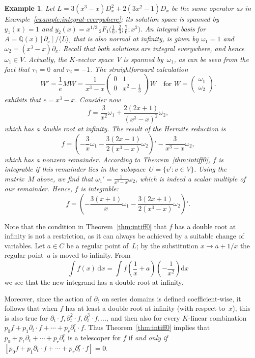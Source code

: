 \documentclass[final,1p,times,authoryear]{elsarticle}
\newtheorem{example}[theorem]{Example}
\def\<#1>{\langle#1\rangle}
\newcommand{\bQ}{ {\mathbb Q}}
\begin{document}
\begin{example}
Let $L = 3 (x^3-x) D_x^2 + 2 (3x^2 - 1) D_x$ be the same operator as in
Example~\ref{example:integral-everywhere}; its solution space is spanned by
$y_1(x)=1$ and $y_2(x)=x^{1/3}{}\,_2F_{\!1}\bigl(\frac16,\frac23;\frac76;x^2\bigr)$.
An integral basis for $A=\bQ(x)[\partial_x]/\<L>$, that is also normal at
infinity, is given by $\omega_1=1$ and $\omega_2=(x^3-x)\partial_x$. Recall
that both solutions are integral everywhere, and hence $\omega_1\in V$.
Actually, the $K$-vector space~$V$ is spanned by~$\omega_1$, as can be seen
from the fact that $\tau_1=0$ and $\tau_2=-1$. The straightforward calculation
\[
  W' = \frac{1}{e}MW =
  \frac{1}{x^3-x}\begin{pmatrix}0 & 1\\ 0 & x^2-\frac13\end{pmatrix}W
  \quad\text{for }W=\begin{pmatrix}\omega_1\\ \omega_2\end{pmatrix}.
\]
exhibits that $e=x^3-x$. Consider now
\[
  f = \frac{3}{x^2}\omega_1 + \frac{2(2x+1)}{(x^3-x)^2}\omega_2,
\]
which has a double root at infinity. The result of the Hermite reduction is
\[
  f = \left(-\frac{3}{x}\omega_1-\frac{3(2x+1)}{2(x^3-x)}\omega_2\right)'
    - \frac{3}{x^3-x}\omega_2,
\]
which has a nonzero remainder. According to Theorem~\ref{thm:intiff0}, $f$
is integrable if this remainder lies in the subspace~$U=\{v':v\in V\}$.
Using the matrix~$M$ above, we find that $\omega_1'=\frac{1}{x^3-x}\omega_2$,
which is indeed a scalar multiple of our remainder. Hence, $f$ is integrable:
\[
  f = \left(-\frac{3(x+1)}{x}\omega_1 - \frac{3(2x+1)}{2(x^3-x)}\omega_2\right)'.
\]
\end{example}

Note that the condition in Theorem~\ref{thm:intiff0} that $f$ has a double
root at infinity is not a restriction, as it can always be achieved by
a suitable change of variables. Let $a\in C$ be a regular point of~$L$; by
the substitution $x\to a+1/x$ the regular point~$a$ is moved to
infinity. From
\[
  \int f(x) \,\mathrm{d}x = \int f\left(\frac{1}{x}+a\right)\left(-\frac{1}{x^2}\right) \mathrm{d}x
\]
we see that the new integrand has a double root at infinity.

Moreover, since the action of $\partial_t$ on series domains is defined coefficient-wise,
it follows that when $f$ has at least a double root at infinity (with respect to~$x$),
this is also true for $\partial_t\cdot f, \partial_t^2\cdot f, \partial_t^3\cdot f,\dots$,
and then also for every $K$-linear combination $p_0f+p_1\partial_t\cdot f+\cdots+p_r\partial_t^r\cdot f$.
Thus Theorem~\ref{thm:intiff0} implies that $p_0+p_1\partial_t+\cdots+p_r\partial_t^r$
is a telescoper for $f$ if \emph{and only if}
$[p_0f+p_1\partial_t\cdot f+\cdots+p_r\partial_t^r\cdot f]=0$.
\end{document}
